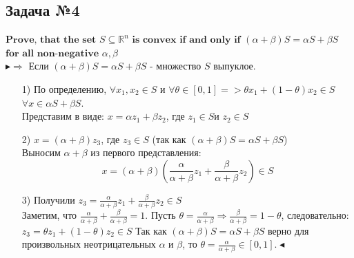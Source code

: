 \documentclass[12pt,letterpaper]{article}
\begin{document}
\subsection*{Задача №4}
$\textbf{Prove, that the set}$ $S \subseteq \mathbb{R}^n$ $\textbf{is convex if and only if}$ $(\alpha + \beta)S = \alpha S + \beta S$ $\textbf{for all non-negative}$ $\alpha, \beta$\\

$\blacktriangleright \Rightarrow$ Если $(\alpha + \beta)S = \alpha S + \beta S$ - множество $ S $ выпуклое.
\begin{itemize}
	\item[1) ] По определению, $ \forall x_1, x_2 \in S $ и $ \forall \theta \in [0,1] => \theta x_1 + (1 - \theta) x_2 \in S$
$ \forall x \in \alpha S + \beta S$. \\
Представим в виде: $ x = \alpha z_1 + \beta z_2 $, где $ z_1 \in S \text{и } z_2 \in S$
	\item[2) ] $ x = (\alpha + \beta) z_3$, где $ z_3 \in S $ (так как $(\alpha + \beta)S = \alpha S + \beta S$)\\
Выносим $ \alpha + \beta $ из первого представления:\\
$$ x = \left( \alpha + \beta \right) \left( \frac{\alpha}{\alpha + \beta} z_1 + \frac{\beta}{\alpha + \beta} z_2 \right) \in S $$
	\item[3) ] Получили $ z_3 = \frac{\alpha}{\alpha + \beta} z_1 + \frac{\beta}{\alpha + \beta} z_2  \in S $\\
Заметим, что $ \frac{\alpha}{\alpha + \beta} + \frac{\beta}{\alpha + \beta} = 1$. Пусть $ \theta =  \frac{\alpha}{\alpha + \beta} \Rightarrow  \frac{\beta}{\alpha + \beta} = 1 - \theta$, следовательно:\\
$ z_3 = \theta z_1 + (1 - \theta) z_2  \in S $
Так как $(\alpha + \beta)S = \alpha S + \beta S$ верно для произвольных неотрицательных $ \alpha $ и $ \beta $, то $ \theta = \frac{\alpha}{\alpha + \beta} \in [0,1]. \blacktriangleleft$
\end{itemize}
\end{document}
